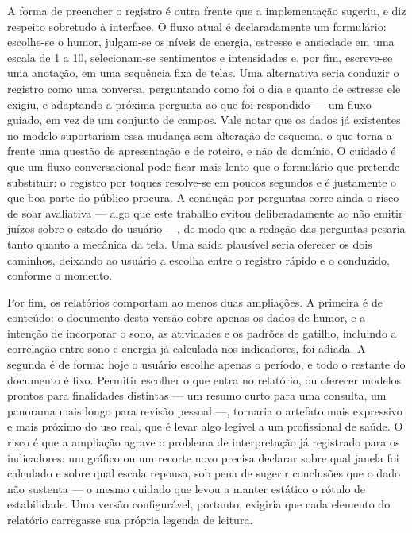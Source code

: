 A forma de preencher o registro é outra frente que a implementação sugeriu,
e diz respeito sobretudo à interface. O fluxo atual é declaradamente um
formulário: escolhe-se o humor, julgam-se os níveis de energia, estresse
e ansiedade em uma escala de 1 a 10, selecionam-se sentimentos e intensidades
e, por fim, escreve-se uma anotação, em uma sequência fixa de telas. Uma
alternativa seria conduzir o registro como uma conversa, perguntando como foi
o dia e quanto de estresse ele exigiu, e adaptando a próxima pergunta ao que
foi respondido --- um fluxo guiado, em vez de um conjunto de campos. Vale notar
que os dados já existentes no modelo suportariam essa mudança sem alteração de
esquema, o que torna a frente uma questão de apresentação e de roteiro, e não
de domínio. O cuidado é que um fluxo conversacional pode ficar mais lento que
o formulário que pretende substituir: o registro por toques resolve-se em
poucos segundos e é justamente o que boa parte do público procura. A condução
por perguntas corre ainda o risco de soar avaliativa --- algo que este trabalho
evitou deliberadamente ao não emitir juízos sobre o estado do usuário ---, de
modo que a redação das perguntas pesaria tanto quanto a mecânica da tela. Uma
saída plausível seria oferecer os dois caminhos, deixando ao usuário a escolha
entre o registro rápido e o conduzido, conforme o momento.

Por fim, os relatórios comportam ao menos duas ampliações. A primeira é de
conteúdo: o documento desta versão cobre apenas os dados de humor, e a intenção
de incorporar o sono, as atividades e os padrões de gatilho, incluindo
a correlação entre sono e energia já calculada nos indicadores, foi adiada.
A segunda é de forma: hoje o usuário escolhe apenas o período, e todo
o restante do documento é fixo. Permitir escolher o que entra no relatório, ou
oferecer modelos prontos para finalidades distintas --- um resumo curto para
uma consulta, um panorama mais longo para revisão pessoal ---, tornaria
o artefato mais expressivo e mais próximo do uso real, que é levar algo legível
a um profissional de saúde. O risco é que a ampliação agrave o problema de
interpretação já registrado para os indicadores: um gráfico ou um recorte novo
precisa declarar sobre qual janela foi calculado e sobre qual escala repousa,
sob pena de sugerir conclusões que o dado não sustenta --- o mesmo cuidado que
levou a manter estático o rótulo de estabilidade. Uma versão configurável,
portanto, exigiria que cada elemento do relatório carregasse sua própria
legenda de leitura.
